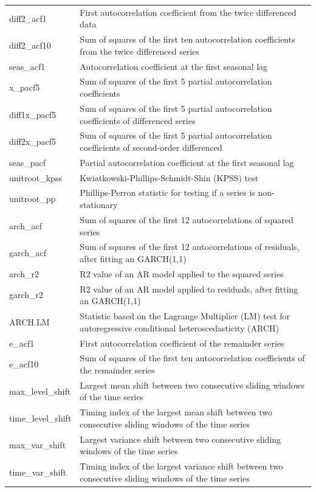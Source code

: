\documentclass[]{elsarticle} %
\begin{document}
\begin{table}[!h]
{\begin{tabular}[t]{ll}
diff2\_acf1 & First autocorrelation coefficient from the twice differenced data\\
diff2\_acf10 & Sum of squares of the first ten autocorrelation coefficients from the twice differenced series\\
seas\_acf1 & Autocorrelation coefficient at the first seasonal lag\\
x\_pacf5 & Sum of squares of the first 5 partial autocorrelation coefficients\\
diff1x\_pacf5 & Sum of squares of the first 5 partial autocorrelation coefficients of differenced series\\
diff2x\_pacf5 & Sum of squares of the first 5 partial autocorrelation coefficients of second-order differenced\\
seas\_pacf & Partial autocorrelation coefficient at the first seasonal lag\\
unitroot\_kpss & Kwiatkowski-Phillips-Schmidt-Shin (KPSS) test\\
unitroot\_pp & Phillips-Perron statistic for testing if a series is non-stationary\\
arch\_acf & Sum of squares of the first 12 autocorrelations of squared series\\
garch\_acf & Sum of squares of the first 12 autocorrelations of residuals, after fitting an GARCH(1,1)\\
arch\_r2 & R2 value of an AR model applied to the squared series\\
garch\_r2 & R2 value of an AR model applied to  residuals, after fitting an GARCH(1,1)\\
ARCH.LM & Statistic based on the Lagrange Multiplier (LM) test  for autoregressive conditional heteroscedasticity (ARCH)\\
e\_acf1 & First autocorrelation coefficient of the remainder series\\
e\_acf10 & Sum of squares of the first ten autocorrelation coefficients of the remainder series\\
max\_level\_shift & Largest mean shift between two consecutive sliding windows of the time series\\
time\_level\_shift & Timing index of the largest mean shift between two consecutive sliding windows of the time series\\
max\_var\_shift & Largest variance shift between two consecutive sliding windows of the time series\\
time\_var\_shift & Timing index of the largest variance shift between two consecutive sliding windows of the time series\\
\bottomrule
\end{tabular}}
\end{table}
\end{document}
